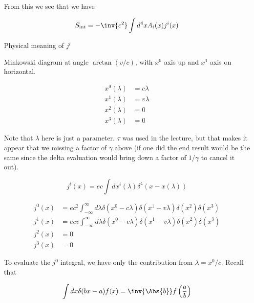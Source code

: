 From this we see that we have

\begin{equation}\label{eqn:relativisticElectrodynamicsL12b:430}
S_{\text{int}} = -\inv{c^2} \int d^4 x A_i(x) j^i(x) 
\end{equation}

Physical meaning of \(j^i\)

Minkowski diagram at angle \(\arctan(v/c)\), with \(x^0\) axis up and \(x^1\) axis on horizontal.

\begin{equation}\label{eqn:relativisticElectrodynamicsL12b:450}
\begin{aligned}
x^0(\lambda) &= c \lambda \\
x^1(\lambda) &= v \lambda \\
x^2(\lambda) &= 0 \\
x^3(\lambda) &= 0
\end{aligned}
\end{equation}

Note that \(\lambda\) here is just a parameter.  \(\tau\) was used in the lecture, but that makes it appear that we missing a factor of \(\gamma\) above (if one did the end result would be the same since the delta evaluation would bring down a factor of \(1/\gamma\) to cancel it out).

\begin{equation}\label{eqn:relativisticElectrodynamicsL12b:470}
j^i(x) = e c \int dx^i(\lambda) \delta^4 (x - x(\lambda))
\end{equation}

\begin{equation}\label{eqn:relativisticElectrodynamicsL12b:490}
\begin{aligned}
j^0(x) &= e c^2  \int_{-\infty}^\infty d\lambda \delta(x^0 -  c \lambda) \delta(x^1 -  v \lambda) \delta(x^2) \delta(x^3) \\
j^1(x) &= e c v  \int_{-\infty}^\infty d\lambda \delta(x^0 -  c \lambda) \delta(x^1 -  v \lambda) \delta(x^2) \delta(x^3) \\
j^2(x) &= 0 \\
j^3(x) &= 0
\end{aligned}
\end{equation}

To evaluate the \(j^0\) integral, we have only the contribution from \(\lambda = x^0/ c\).  Recall that 

\begin{equation}\label{eqn:relativisticElectrodynamicsL12b:510}
\int dx \delta( b x - a) f(x) = \inv{\Abs{b}} f\left( \frac{a}{b} \right)
\end{equation}

